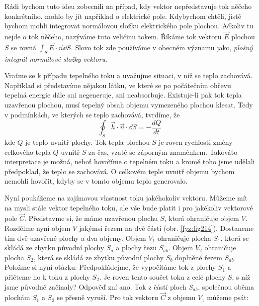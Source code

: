     Rádi bychom tuto ideu zobecnili na případ, kdy vektor nepředstavuje tok něčeho konkrétního, 
    mohlo by jít například o elektrické pole. Kdybychom chtěli, jistě bychom mohli integrovat 
    normálovou složku elektrického pole plochou. Ačkoliv tu nejde o tok něčeho, nazýváme tuto 
    veličinu tokem. Říkáme tok vektoru $\vec{E}$ plochou \(S\) se rovná 
    \(\int_S\vec{E}\cdot\vec{n}\dd{S}\). Slovo tok zde používáme v obecném významu jako, 
    \emph{plošný integrál normálové složky vektoru}.      
    
    Vraťme se k případu tepelného toku a uvažujme situaci, v níž se teplo zachovává. Například si
    představíme nějakou látku, ve které se po počátečním ohřevu tepelná energie dále ani 
    negeneruje, ani neabsorbuje. Existuje-li pak tok tepla uzavřenou plochou, musí tepelný obsah 
    objemu vymezeného plochou klesat. Tedy v podmínkách, ve kterých se teplo zachovává, tvrdíme, že
    \begin{equation}\label{fyz:eq_int_fey_dQ}
      \oint_S\vec{h}\cdot\vec{n}\cdot\dd{S} = - \frac{dQ}{dt}
    \end{equation}
    kde $Q$ je teplo uvnitř plochy. Tok tepla plochou $S$ je roven rychlosti změny celkového tepla 
    $Q$ uvnitř $S$ za čas, vzaté se záporným znaménkem. Takováto interpretace je možná, neboť 
    hovoříme o tepelném toku a kromě toho jsme udělali předpoklad, že teplo se zachovává. O 
    celkovém teple uvnitř objemu bychom nemohli hovořit, kdyby se v tomto objemu teplo generovalo.
    
    Nyní poukážeme na zajímavou vlastnost toku jakéhokoliv vektoru. Můžeme mít na mysli stále 
    vektor tepelného toku, ale vše bude platit i pro jakékoliv vektorové pole $\vec{C}$. Představme 
    si, že máme uzavřenou plochu $S$, která ohraničuje objem $V$. Rozdělme nyní objem $V$ jakýmsi 
    řezem na dvě části (obr. \ref{fyz:fig214}). Dostaneme tím dvě uzavřené plochy a dva objemy. 
    Objem $V_1$ ohraničuje plocha $S_1$, která se skládá ze zbytku původní plochy $S_a$ a plochy 
    řezu $S_{ab}$. Objem $V_2$ ohraničuje plocha $S_2$, která se skládá ze zbytku původní plochy 
    $S_b$ doplněné řezem $S_{ab}$. Položme si nyní otázku: Předpokládejme, že vypočítáme tok z 
    plochy $S_1$ a přičteme ho k toku z plochy $S_2$. Je roven tento součet toku z celé plochy $S$, 
    s níž jsme původně začínaly? Odpověď zní ano. Tok z částí ploch $S_{ab}$, společnou oběma 
    plochám $S_1$ a $S_2$ se přesně vyruší. Pro tok vektoru $\vec{C}$ z objemu $V_1$ můžeme psát:
    
